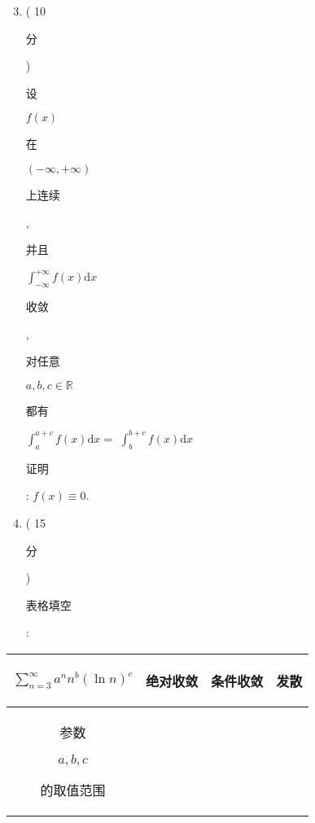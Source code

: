 \documentclass[10pt]{article}
\begin{document}
\begin{enumerate}
  \setcounter{enumi}{2}
  \item ( 10 \begin{CJK}{UTF8}{mj}分\end{CJK}) \begin{CJK}{UTF8}{mj}设\end{CJK} $f(x)$ \begin{CJK}{UTF8}{mj}在\end{CJK} $(-\infty,+\infty)$ \begin{CJK}{UTF8}{mj}上连续\end{CJK}, \begin{CJK}{UTF8}{mj}并且\end{CJK} $\int_{-\infty}^{+\infty} f(x) \mathrm{d} x$ \begin{CJK}{UTF8}{mj}收敛\end{CJK}, \begin{CJK}{UTF8}{mj}对任意\end{CJK} $a, b, c \in \mathbb{R}$ \begin{CJK}{UTF8}{mj}都有\end{CJK} $\int_{a}^{a+c} f(x) \mathrm{d} x=$ $\int_{b}^{b+c} f(x) \mathrm{d} x$ \begin{CJK}{UTF8}{mj}证明\end{CJK}: $f(x) \equiv 0 .$

  \item ( 15 \begin{CJK}{UTF8}{mj}分\end{CJK}) \begin{CJK}{UTF8}{mj}表格填空\end{CJK}:

\end{enumerate}
\begin{tabular}{|c|l|l|l|}
\hline
$\sum_{n=3}^{\infty} a^{n} n^{b}(\ln n)^{c}$ & \begin{CJK}{UTF8}{mj}绝对收敛\end{CJK} & \begin{CJK}{UTF8}{mj}条件收敛\end{CJK} & \begin{CJK}{UTF8}{mj}发散\end{CJK} \\
\hline
\begin{CJK}{UTF8}{mj}参数\end{CJK} $a, b, c$ \begin{CJK}{UTF8}{mj}的取值范围\end{CJK} &  &  &  \\
\hline
\end{tabular}
\end{document}
